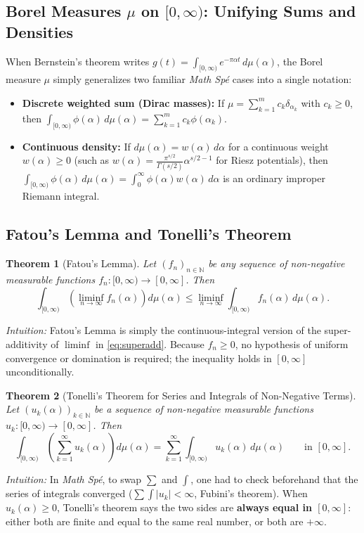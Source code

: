 \documentclass[11pt, a4paper]{article}
\newtheorem{theorem}{Theorem}[section]
\theoremstyle{definition}
\theoremstyle{remark}
\newcommand{\N}{\mathbb{N}}
\newcommand{\abs}[1]{\left\lvert #1 \right\rvert}
\begin{document}
\subsection{Borel Measures $\mu$ on $[0, \infty)$: Unifying Sums and Densities}
When Bernstein's theorem writes $g(t) = \int_{[0, \infty)} e^{-\pi \alpha t} \, d\mu(\alpha)$, the Borel measure $\mu$ simply generalizes two familiar \textit{Math Sp\'e} cases into a single notation:
\begin{itemize}
    \item \textbf{Discrete weighted sum (Dirac masses):} If $\mu = \sum_{k=1}^m c_k \delta_{\alpha_k}$ with $c_k \ge 0$, then $\int_{[0, \infty)} \phi(\alpha) \, d\mu(\alpha) = \sum_{k=1}^m c_k \phi(\alpha_k)$.
    \item \textbf{Continuous density:} If $d\mu(\alpha) = w(\alpha) \, d\alpha$ for a continuous weight $w(\alpha) \ge 0$ (such as $w(\alpha) = \frac{\pi^{s/2}}{\Gamma(s/2)} \alpha^{s/2 - 1}$ for Riesz potentials), then $\int_{[0, \infty)} \phi(\alpha) \, d\mu(\alpha) = \int_0^\infty \phi(\alpha) w(\alpha) \, d\alpha$ is an ordinary improper Riemann integral.
\end{itemize}

\subsection{Fatou's Lemma and Tonelli's Theorem}

\begin{theorem}[Fatou's Lemma]
\label{thm:fatou}
Let $(f_n)_{n \in \N}$ be any sequence of non-negative measurable functions $f_n : [0, \infty) \to [0, \infty]$. Then
\[
\int_{[0, \infty)} \left(\liminf_{n \to \infty} f_n(\alpha)\right) d\mu(\alpha) \le \liminf_{n \to \infty} \int_{[0, \infty)} f_n(\alpha) \, d\mu(\alpha).
\]
\end{theorem}
\noindent \textit{Intuition:} Fatou's Lemma is simply the continuous-integral version of the super-additivity of $\liminf$ in \eqref{eq:superadd}. Because $f_n \ge 0$, no hypothesis of uniform convergence or domination is required; the inequality holds in $[0, \infty]$ unconditionally.

\begin{theorem}[Tonelli's Theorem for Series and Integrals of Non-Negative Terms]
\label{thm:tonelli}
Let $(u_k(\alpha))_{k \in \N}$ be a sequence of non-negative measurable functions $u_k : [0, \infty) \to [0, \infty]$. Then
\[
\int_{[0, \infty)} \left(\sum_{k=1}^\infty u_k(\alpha)\right) d\mu(\alpha) = \sum_{k=1}^\infty \int_{[0, \infty)} u_k(\alpha) \, d\mu(\alpha) \qquad \text{in } [0, \infty].
\]
\end{theorem}
\noindent \textit{Intuition:} In \textit{Math Sp\'e}, to swap $\sum$ and $\int$, one had to check beforehand that the series of integrals converged ($\sum \int \abs{u_k} < \infty$, Fubini's theorem). When $u_k(\alpha) \ge 0$, Tonelli's theorem says the two sides are \textbf{always equal in $[0, \infty]$}: either both are finite and equal to the same real number, or both are $+\infty$.
\end{document}
